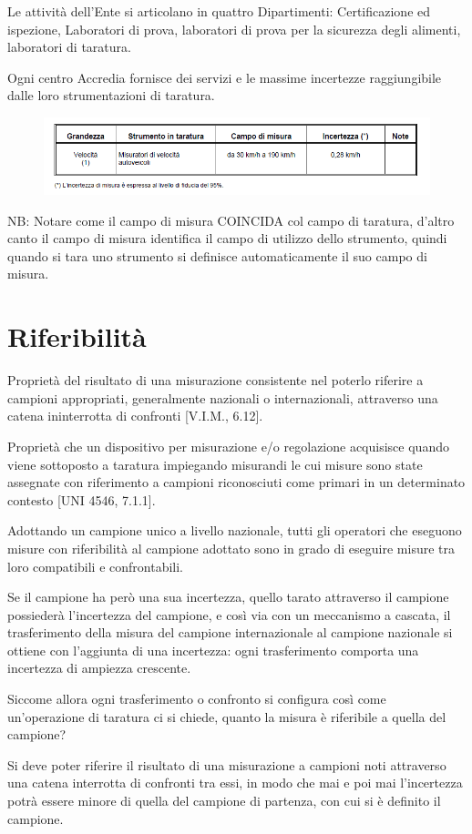 \documentclass[a4paper, 15pt]{article}
\begin{document}
\begin{adjustwidth}{2in}{}
   		Le attività dell'Ente si articolano in quattro Dipartimenti: Certificazione ed ispezione, Laboratori di prova, laboratori di prova per la sicurezza degli alimenti, laboratori di taratura. \newline 
   		
   		Ogni centro Accredia fornisce dei servizi e le massime incertezze raggiungibile dalle loro strumentazioni di taratura.    		
\begin{figure}[H]
	\centering
	\includegraphics[width=0.5\linewidth]{fig/screenshot015}
	\label{fig:screenshot015}
\end{figure}  		
   		NB: Notare come il campo di misura COINCIDA col campo di taratura, d'altro canto il campo di misura identifica il campo di utilizzo dello strumento, quindi quando si tara uno strumento si definisce automaticamente il suo campo di misura. 
\end{adjustwidth}
\section{Riferibilità}
\begin{adjustwidth}{2in}{}     		
   		Proprietà del risultato di una misurazione consistente nel poterlo riferire a
   		campioni appropriati, generalmente nazionali o internazionali, attraverso una
   		catena ininterrotta di confronti [V.I.M., 6.12].
   		
   		Proprietà che un dispositivo per misurazione e/o regolazione acquisisce
   		quando viene sottoposto a taratura impiegando misurandi le cui misure sono
   		state assegnate con riferimento a campioni riconosciuti come primari in un
   		determinato contesto [UNI 4546, 7.1.1].\newline 
   		
   		Adottando un campione unico a livello nazionale, tutti gli operatori che
   		eseguono misure con riferibilità al campione adottato sono in grado di
   		eseguire misure tra loro compatibili e confrontabili.\newline
   		
   		Se il campione ha però una sua incertezza, quello tarato attraverso il campione possiederà l'incertezza del campione, e così via con un meccanismo a cascata, il trasferimento della misura del campione internazionale al campione
   		nazionale si ottiene con l’aggiunta di una incertezza: ogni trasferimento
   		comporta una incertezza di ampiezza crescente. 
   		
   		Siccome allora ogni trasferimento o confronto si configura così come un'operazione di taratura ci si chiede, quanto la misura è riferibile a quella del campione? 
   		
   		Si deve poter riferire il risultato di una misurazione a campioni noti attraverso una catena interrotta di confronti tra essi, in modo che mai e poi mai l'incertezza potrà essere minore di quella del campione di partenza, con cui si è definito il campione. 
\end{adjustwidth}
\end{document}
